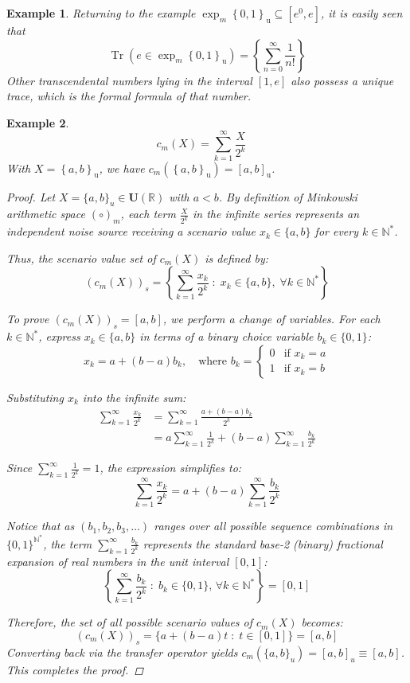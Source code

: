 \documentclass[a4paper,12pt, twoside]{memoir}
\newtheorem{example}{Example}[chapter]
\DeclareMathOperator{\Tr}{Tr}
\newcommand{\set}[1]{\left\{#1\right\}} %
\newcommand{\s}[1]{\set{#1}_\mathrm{u}} %
\newcommand{\kbd}[1]{{#1}_\mathrm{u}} %
\newcommand{\tsbd}[1]{\mathbf{U}(\mathbb{#1})}
\newcommand{\hbd}[2]{#1_m\left(#2\right)} %
\begin{document}
\begin{example}
	Returning to the example $\exp_m\s{0,1} \subseteq [e^0,e]$, it is easily seen that
	$$\Tr(e \in \exp_m\s{0,1}) = \left\{\sum_{n=0}^{\infty}\frac{1}{n!}\right\}$$
	Other transcendental numbers lying in the interval $[1,e]$ also possess a unique trace, which is the formal formula of that number.
\end{example}

\begin{example}
	$$\hbd{c}{X} = \sum_{k=1}^{\infty} \frac{X}{2^k} \quad$$
	With $X=\s{a,b}$, we have $\hbd{c}{\s{a,b}} = \kbd{[a,b]}$.

	\begin{proof}
		Let $X = \{a, b\}_u \in \tsbd{R}$ with $a < b$. By definition of Minkowski arithmetic space $(\circ)_m$, each term $\frac{X}{2^k}$ in the infinite series represents an independent noise source receiving a scenario value $x_k \in \{a, b\}$ for every $k \in \mathbb{N}^*$.

		Thus, the scenario value set of $\hbd{c}{X}$ is defined by:
		\[
			(\hbd{c}{X})_s = \left\{ \sum_{k=1}^{\infty} \frac{x_k}{2^k} \;:\; x_k \in \{a, b\}, \; \forall k \in \mathbb{N}^* \right\}
		\]

		To prove $(\hbd{c}{X})_s = [a, b]$, we perform a change of variables. For each $k \in \mathbb{N}^*$, express $x_k \in \{a, b\}$ in terms of a binary choice variable $b_k \in \{0, 1\}$:
		\[
			x_k = a + (b - a)b_k, \quad \text{where } b_k = \begin{cases} 0 & \text{if } x_k = a \\ 1 & \text{if } x_k = b \end{cases}
		\]

		Substituting $x_k$ into the infinite sum:
		\begin{align*}
			\sum_{k=1}^{\infty} \frac{x_k}{2^k} & = \sum_{k=1}^{\infty} \frac{a + (b - a)b_k}{2^k}                                    \\
			                                    & = a \sum_{k=1}^{\infty} \frac{1}{2^k} + (b - a) \sum_{k=1}^{\infty} \frac{b_k}{2^k}
		\end{align*}

		Since $\sum_{k=1}^{\infty} \frac{1}{2^k} = 1$, the expression simplifies to:
		\[
			\sum_{k=1}^{\infty} \frac{x_k}{2^k} = a + (b - a) \sum_{k=1}^{\infty} \frac{b_k}{2^k}
		\]

		Notice that as $(b_1, b_2, b_3, \dots)$ ranges over all possible sequence combinations in $\{0, 1\}^{\mathbb{N}^*}$, the term $\sum_{k=1}^{\infty} \frac{b_k}{2^k}$ represents the standard base-2 (binary) fractional expansion of real numbers in the unit interval $[0, 1]$:
		\[
			\left\{ \sum_{k=1}^{\infty} \frac{b_k}{2^k} \;:\; b_k \in \{0, 1\}, \, \forall k \in \mathbb{N}^* \right\} = [0, 1]
		\]

		Therefore, the set of all possible scenario values of $\hbd{c}{X}$ becomes:
		\[
			(\hbd{c}{X})_s = \{a + (b - a)t \;:\; t \in [0, 1]\} = [a, b]
		\]
		Converting back via the transfer operator yields $\hbd{c}{\{a, b\}_u} = [a, b]_u \equiv [a, b]$. This completes the proof.
	\end{proof}
\end{example}
\end{document}
